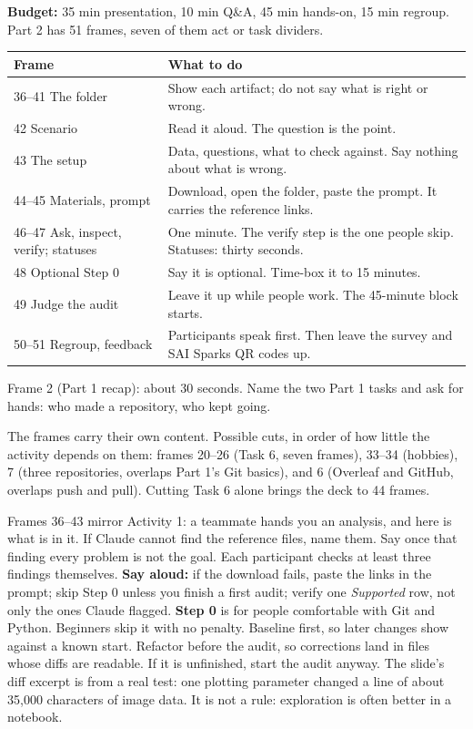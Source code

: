 
\newcommand{\sheetlabel}{Part 2}
\small
{}
\textbf{Budget:} 35 min presentation, 10 min Q\&A, 45 min hands-on, 15 min regroup. Part 2 has 51 frames, seven of them act or task dividers.

\begin{tabularx}{\linewidth}{@{}p{1.45in}X@{}}
\toprule
\textbf{Frame} & \textbf{What to do}\\
\midrule
36--41 The folder & Show each artifact; do not say what is right or wrong.\\
42 Scenario & Read it aloud. The question is the point.\\
43 The setup & Data, questions, what to check against. Say nothing about what is wrong.\\
44--45 Materials, prompt & Download, open the folder, paste the prompt. It carries the reference links.\\
46--47 Ask, inspect, verify; statuses & One minute. The verify step is the one people skip. Statuses: thirty seconds.\\
48 Optional Step 0 & Say it is optional. Time-box it to 15 minutes.\\
49 Judge the audit & Leave it up while people work. The 45-minute block starts.\\
50--51 Regroup, feedback & Participants speak first. Then leave the survey and SAI Sparks QR codes up.\\
\bottomrule
\end{tabularx}

Frame 2 (Part 1 recap): about 30 seconds. Name the two Part 1 tasks and ask for hands: who made a repository, who kept going.

The frames carry their own content. Possible cuts, in order of how little the activity depends on them: frames 20--26 (Task 6, seven frames), 33--34 (hobbies), 7 (three repositories, overlaps Part 1's Git basics), and 6 (Overleaf and GitHub, overlaps push and pull). Cutting Task 6 alone brings the deck to 44 frames.

Frames 36--43 mirror Activity 1: a teammate hands you an analysis, and here is what is in it. If Claude cannot find the reference files, name them. Say once that finding every problem is not the goal. Each participant checks at least three findings themselves.
\textbf{Say aloud:} if the download fails, paste the links in the prompt; skip Step 0 unless you finish a first audit; verify one \emph{Supported} row, not only the ones Claude flagged.
\textbf{Step 0} is for people comfortable with Git and Python. Beginners skip it with no penalty. Baseline first, so later changes show against a known start. Refactor before the audit, so corrections land in files whose diffs are readable. If it is unfinished, start the audit anyway. The slide's diff excerpt is from a real test: one plotting parameter changed a line of about 35,000 characters of image data. It is not a rule: exploration is often better in a notebook.

